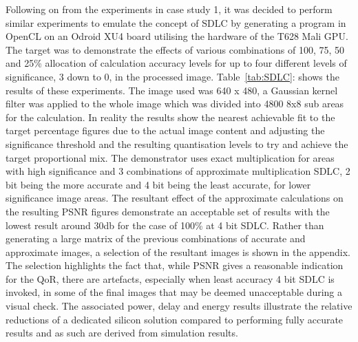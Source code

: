 \documentclass[journal]{IEEEtran}
\begin{document}
Following on from the experiments in case study 1, it was decided to perform similar experiments to emulate the concept of SDLC by generating a program in OpenCL on an Odroid XU4 board utilising the hardware of the T628 Mali GPU. The target was to demonstrate the effects of various combinations of 100, 75, 50 and 25\% allocation of calculation accuracy levels for up to four different levels of significance, 3 down to 0, in the processed image. Table~\ref{tab:SDLC}: shows the results of these experiments. The image used was 640 x 480, a Gaussian kernel filter was applied to the whole image which was divided into 4800 8x8 sub areas for the calculation.  In reality the results show the nearest achievable fit to the target percentage figures due to the actual image content and adjusting the significance threshold and the resulting quantisation levels to try and achieve the target proportional mix. The demonstrator uses exact multiplication for areas with high significance and 3 combinations of approximate multiplication SDLC, 2 bit being the more accurate and 4 bit being the least accurate, for lower significance image areas. The resultant effect of the approximate calculations on the resulting PSNR figures demonstrate an acceptable set of results \cite{Mittal2013,Rahimi2015} with the lowest result around 30db for the case of 100\% at 4 bit SDLC. Rather than generating a large matrix of the previous combinations of accurate and approximate images, a selection of the resultant images is shown in the appendix. The selection highlights the fact that, while PSNR gives a reasonable indication for the QoR, there are artefacts, especially when least accuracy 4 bit SDLC is invoked, in some of the final images that may be deemed unacceptable during a visual check.
The associated power, delay and energy results illustrate the relative reductions of a dedicated silicon solution compared to performing fully accurate results and as such are derived from simulation results.\\

\end{document}
